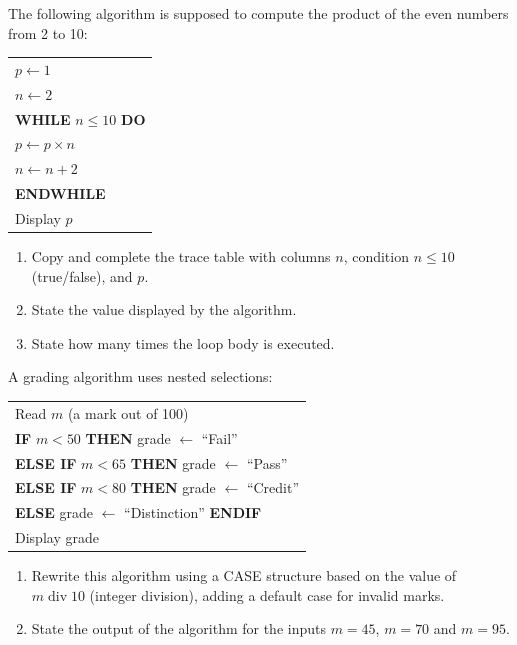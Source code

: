 \documentclass[11pt]{article}
\begin{document}
\begin{exercice}
The following algorithm is supposed to compute the product of the even numbers from 2 to 10:
\begin{center}
\begin{tabular}{l}
$p \leftarrow 1$\\
$n \leftarrow 2$\\
\textbf{WHILE} $n \leq 10$ \textbf{DO}\\
\hspace{0.6cm} $p \leftarrow p \times n$\\
\hspace{0.6cm} $n \leftarrow n + 2$\\
\textbf{ENDWHILE}\\
Display $p$
\end{tabular}
\end{center}
\begin{enumerate}
\item Copy and complete the trace table with columns $n$, condition $n \leq 10$ (true/false), and $p$.
\item State the value displayed by the algorithm.
\item State how many times the loop body is executed.
\end{enumerate}
\end{exercice}

\begin{exercice}
A grading algorithm uses nested selections:
\begin{center}
\begin{tabular}{l}
Read $m$ \quad (a mark out of 100)\\
\textbf{IF} $m < 50$ \textbf{THEN} grade $\leftarrow$ ``Fail''\\
\textbf{ELSE IF} $m < 65$ \textbf{THEN} grade $\leftarrow$ ``Pass''\\
\textbf{ELSE IF} $m < 80$ \textbf{THEN} grade $\leftarrow$ ``Credit''\\
\textbf{ELSE} grade $\leftarrow$ ``Distinction'' \textbf{ENDIF}\\
Display grade
\end{tabular}
\end{center}
\begin{enumerate}
\item Rewrite this algorithm using a CASE structure based on the value of $m \operatorname{div} 10$ (integer division), adding a default case for invalid marks.
\item State the output of the algorithm for the inputs $m = 45$, $m = 70$ and $m = 95$.
\end{enumerate}
\end{exercice}
\end{document}
